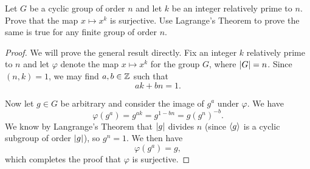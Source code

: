  Let $G$ be a cyclic group of order $n$ and let $k$ be an
integer relatively prime to $n$. Prove that the map $x\mapsto x^k$ is
surjective. Use Lagrange's Theorem to prove the same is true for any
finite group of order $n$.
\begin{proof}
  We will prove the general result directly. Fix an integer $k$
  relatively prime to $n$ and let $\varphi$ denote the map
  $x\mapsto x^k$ for the group $G$, where $\lvert{G}\rvert = n$. Since
  $(n,k) = 1$, we may find $a,b\in\mathbb{Z}$ such that
  \begin{equation*}
    ak + bn = 1.
  \end{equation*}

  Now let $g\in G$ be arbitrary and consider the image of $g^a$ under
  $\varphi$. We have
  \begin{equation*}
    \varphi(g^a) = g^{ak} = g^{1 - bn} = g(g^n)^{-b}.
  \end{equation*}
  We know by Langrange's Theorem that $\lvert{g}\rvert$ divides $n$ (since
  $\langle{g}\rangle$ is a cyclic subgroup of order $\lvert{g}\rvert$), so $g^n =
  1$. We then have
  \begin{equation*}
    \varphi(g^a) = g,
  \end{equation*}
  which completes the proof that $\varphi$ is surjective.
\end{proof}
